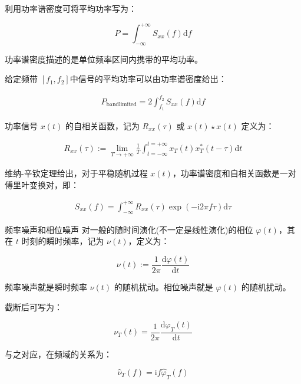 \documentclass{beamer}
\begin{document}
\begin{frame}

    利用功率谱密度可将平均功率写为：

    $$
    P
    =\int_{-\infty}^{+\infty} S_{xx}(f)\mathrm{d}f
    $$

    功率谱密度描述的是单位频率区间内携带的平均功率。

    给定频带 $[f_1,f_2]$中信号的平均功率可以由功率谱密度给出：

    $$
    \begin{aligned}
    P_{\mathrm{bandlimited}}
    =2\int_{f_1}^{f_2} S_{xx}(f)\mathrm{d}f
    \end{aligned}
    $$

    功率信号 $x(t) $ 的自相关函数，记为 $R_{xx}(\tau)$ 或 $x(t)\star x(t)$ 定义为：

    $$
    \begin{aligned}
    R_{xx}(\tau)
    :=\lim_{T\to +\infty}\frac{1}{T} \int_{t=-\infty}^{t=+\infty} x_T(t)x_T^*(t-\tau)\mathrm{d}t
    \end{aligned}
    $$

    维纳-辛钦定理给出，对于平稳随机过程 $x(t)$，功率谱密度和自相关函数是一对傅里叶变换对，即：

    $$
    \begin{aligned}
    S_{xx}(f)
    =\int_{-\infty}^{+\infty} R_{xx}(\tau)\exp(-\mathrm{i}2\pi f \tau) \mathrm{d}\tau
    \end{aligned}
    $$

\end{frame}

\begin{frame}{频率噪声和相位噪声}
    对一般的随时间演化(不一定是线性演化)的相位 $\varphi(t) $，其在 $t$ 时刻的瞬时频率，记为 $\nu(t)$，定义为：

    $$
    \nu(t)
    :=\frac{1}{2\pi}\frac{\mathrm{d}\varphi(t)}{\mathrm{d}t}
    $$

    频率噪声就是瞬时频率 $\nu(t)$ 的随机扰动。相位噪声就是 $\varphi(t)$ 的随机扰动。

    截断后可写为：

    $$
    \nu_T(t)
    =\frac{1}{2\pi} \frac{\mathrm{d}\varphi_T(t)}{\mathrm{d}t}
    $$

    与之对应，在频域的关系为：

    $$
    \hat{\nu}_{T}(f)
    =\mathrm{i}f\hat{\varphi}_T(f)
    $$

\end{frame}
\end{document}

